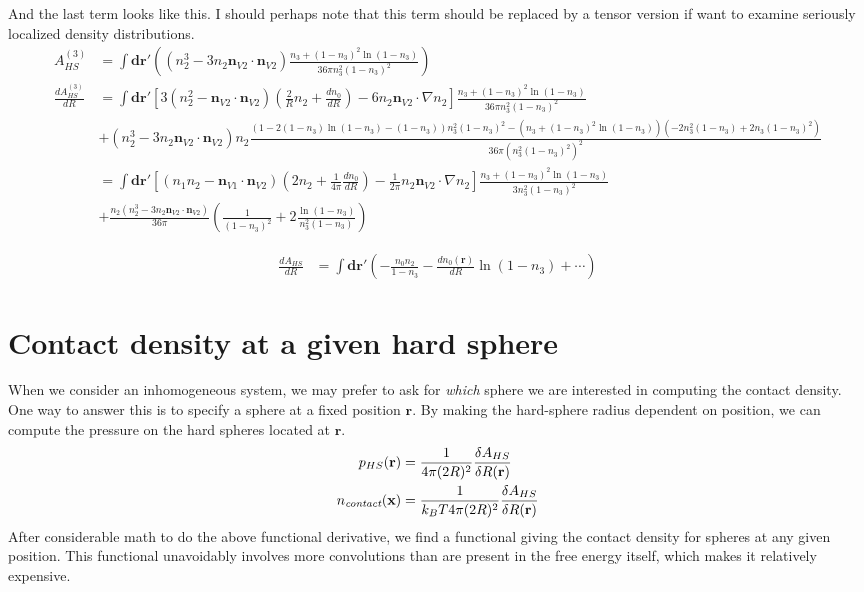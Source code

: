 \documentclass[letterpaper,twocolumn,amsmath,amssymb,prb]{revtex4-1}
\newcommand{\xx}{\textbf{x}}
\begin{document}
{  And the last term looks like this.  I should perhaps note that this
  term should be replaced by a tensor version if want to examine
  seriously localized density distributions.
  \begin{align}
    A_{HS}^{(3)} &=
    \int \mathbf{dr}'\left(
    (n_2^3 - 3n_2\mathbf{n}_{V2} \cdot \mathbf{n}_{V2})
    \frac{
      n_3 + (1-n_3)^2 \ln(1-n_3)
    }{
      36\pi n_3^2\left( 1 - n_3 \right)^2
    }
    \right) \\
    \frac{d A_{HS}^{(3)}}{d R} &=
    \int \mathbf{dr}'
    \left[
      3(n_2^2 - \mathbf{n}_{V2} \cdot \mathbf{n}_{V2})
      \left(\frac2{R}n_2 + \frac{dn_0}{dR}\right)
      - 6n_2 \mathbf{n}_{V2} \cdot \nabla n_2
      \right]
    \frac{
      n_3 + (1-n_3)^2 \ln(1-n_3)
    }{
      36\pi n_3^2\left( 1 - n_3 \right)^2
    }
    \\
    &+
    (n_2^3 - 3n_2\mathbf{n}_{V2} \cdot \mathbf{n}_{V2}) n_2
    \frac{
      (1 - 2(1-n_3)\ln(1-n_3) - (1-n_3))n_3^2( 1 - n_3)^2
      -
      (n_3 + (1-n_3)^2 \ln(1-n_3))(-2 n_3^2( 1 - n_3) + 2n_3(1-n_3)^2)
    }{
      36\pi (n_3^2\left( 1 - n_3 \right)^2)^2
    }
    \\
    &=
    \int \mathbf{dr}'
    \left[
      (n_1n_2 - \mathbf{n}_{V1} \cdot \mathbf{n}_{V2})
      \left(2n_2 + \frac{1}{4\pi}\frac{dn_0}{dR}\right)
      - \frac{1}{2\pi}n_2 \mathbf{n}_{V2} \cdot \nabla n_2
      \right]
    \frac{
      n_3 + (1-n_3)^2 \ln(1-n_3)
    }{
      3 n_3^2\left( 1 - n_3 \right)^2
    }
    \\
    &+
    \frac{n_2(n_2^3 - 3n_2\mathbf{n}_{V2} \cdot \mathbf{n}_{V2})}{36\pi}
    \left( \frac{1}{(1-n_3)^2} + 2 \frac{\ln(1-n_3)}{n_3^2(1-n_3)} \right)
  \end{align}
  
  \begin{align}
    \frac{d A_{HS}}{d R} &=
    \int \mathbf{dr}' \left(
    -\frac{n_0n_2}{1-n_3} - \frac{dn_0(\mathbf{r})}{dR}\ln(1-n_3)
    + \cdots
    \right)
  \end{align}
}

\section{Contact density at a given hard
  sphere}\label{contact-at-sphere}

When we consider an inhomogeneous system, we may prefer to ask for
\emph{which} sphere we are interested in computing the contact
density.  One way to answer this is to specify a sphere at a fixed
position $\mathbf{r}$.  By making the hard-sphere radius dependent on
position, we can compute the pressure on the hard spheres located at
$\mathbf{r}$.
\begin{align}
  p_{HS}(\mathbf{r}) &= \frac{1}{4\pi (2R)^2} \frac{\delta
    A_{HS}}{\delta R(\mathbf{r})} \\
  \ncontact(\xx) &= \frac{1}{k_BT 4\pi (2R)^2} \frac{\delta
    A_{HS}}{\delta R(\mathbf{r})}
\end{align}
After considerable math to do the above functional derivative, we find
a functional giving the contact density for spheres at any given
position.  This functional unavoidably involves more convolutions than
are present in the free energy itself, which makes it relatively
expensive.
\end{document}

